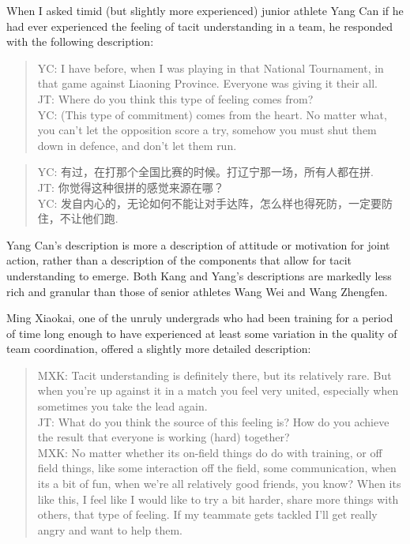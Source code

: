 \begin{CJK}{UTF8}{gbsn}
When I asked timid (but slightly more experienced) junior athlete Yang Can if he had ever experienced the feeling of tacit understanding in a team, he responded with the following description:

    \begin{quote}
      YC: I have before, when I was playing in that National Tournament, in that game against Liaoning Province.  Everyone was giving it their all. \\
      JT: Where do you think this type of feeling comes from? \\
      YC: (This type of commitment) comes from the heart. No matter what, you can’t let the opposition score a try, somehow you must shut them down in defence, and don’t let them run.
    \end{quote}

    \begin{quote}
      YC: 有过，在打那个全国比赛的时候。打辽宁那一场，所有人都在拼.\\
      JT: 你觉得这种很拼的感觉来源在哪？\\
      YC: 发自内心的，无论如何不能让对手达阵，怎么样也得死防，一定要防住，不让他们跑.
    \end{quote}

Yang Can's description is more a description of attitude or motivation for joint action, rather than a description of the components that allow for tacit understanding to emerge.  Both Kang and Yang's descriptions are markedly less rich and granular than those of senior athletes Wang Wei and Wang Zhengfen.

Ming Xiaokai, one of the unruly undergrads who had been training for a period of time long enough to have experienced at least some variation in the quality of team coordination, offered a slightly more detailed description:

    \begin{quote}
        MXK: Tacit understanding is definitely there, but its relatively rare. But when you’re up against it in a match you feel very united, especially when sometimes you take the lead again. \\
        JT: What do you think the source of this feeling is?  How do you achieve the result that everyone is working (hard) together? \\
        MXK: No matter whether its on-field things do do with training, or off field things, like some interaction off the field, some communication, when its a bit of fun, when we're all relatively good friends, you know?  When its like this, I feel like I would like to try a bit harder, share more things with others, that type of feeling.  If my teammate gets tackled I'll get really angry and want to help them.
    \end{quote}


\end{CJK}
